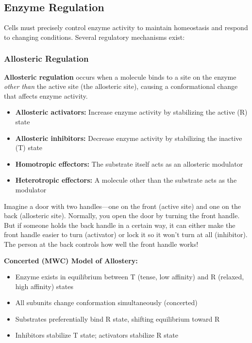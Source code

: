 \subsection{Enzyme Regulation}

Cells must precisely control enzyme activity to maintain homeostasis and respond to changing conditions. Several regulatory mechanisms exist:

\subsubsection{Allosteric Regulation}

\begin{definition}
\textbf{Allosteric regulation} occurs when a molecule binds to a site on the enzyme \textit{other than} the active site (the allosteric site), causing a conformational change that affects enzyme activity.
\end{definition}

\begin{itemize}
    \item \textbf{Allosteric activators:} Increase enzyme activity by stabilizing the active (R) state
    \item \textbf{Allosteric inhibitors:} Decrease enzyme activity by stabilizing the inactive (T) state
    \item \textbf{Homotropic effectors:} The substrate itself acts as an allosteric modulator
    \item \textbf{Heterotropic effectors:} A molecule other than the substrate acts as the modulator
\end{itemize}

\begin{analogy}
Imagine a door with two handles---one on the front (active site) and one on the back (allosteric site). Normally, you open the door by turning the front handle. But if someone holds the back handle in a certain way, it can either make the front handle easier to turn (activator) or lock it so it won't turn at all (inhibitor). The person at the back controls how well the front handle works!
\end{analogy}

\begin{theorem}
\textbf{Concerted (MWC) Model of Allostery:}
\begin{itemize}
    \item Enzyme exists in equilibrium between T (tense, low affinity) and R (relaxed, high affinity) states
    \item All subunits change conformation simultaneously (concerted)
    \item Substrates preferentially bind R state, shifting equilibrium toward R
    \item Inhibitors stabilize T state; activators stabilize R state
\end{itemize}
\end{theorem}

